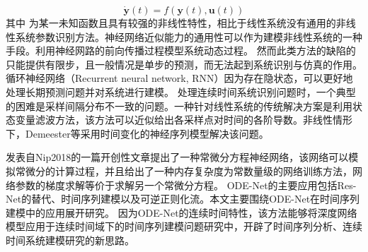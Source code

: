 \begin{equation}
\dot {\boldsymbol y}(t)=f(\boldsymbol y(t), \boldsymbol{u}(t))
\end{equation}
其中 为某一未知函数且具有较强的非线性特性，相比于线性系统没有通用的非线性系统参数识别方法。神经网络近似能力的通用性可以作为建模非线性系统的一种手段\cite{funahashi1993approximation}。利用神经网路的前向传播过程模型系统动态过程\cite{temeng1995model, tan1996nonlinear}。
然而此类方法的缺陷的只能提供有限步，且一般情况是单步的预测，而无法起到系统识别与仿真的作用。循环神经网络（Recurrent neural network, RNN）因为存在隐状态，可以更好地处理长期预测问题并对系统进行建模\cite{delgado1995dynamic, zamarreno1998state}。
处理连续时间系统识别问题时，一个典型的困难是采样间隔分布不一致的问题。一种针对线性系统的传统解决方案是利用状态变量滤波方法，该方法可以近似给出各采样点对时间的各阶导数。非线性情形下，Demeester等\cite{demeester2020system}采用时间变化的神经序列模型解决该问题。

发表自Nip2018的一篇开创性文章\cite{chen2018neural}提出了一种常微分方程神经网络，该网络可以模拟常微分的计算过程，并且给出了一种内存复杂度为常数量级的网络训练方法，网络参数的梯度求解等价于求解另一个常微分方程。
ODE-Net的主要应用包括Res-Net的替代、时间序列建模以及可逆正则化流\cite{Grathwohl2019}。本文主要围绕ODE-Net在时间序列建模中的应用展开研究。
因为ODE-Net的连续时间特性，该方法能够将深度网络模型应用于连续时间域下的时间序列建模问题研究中，开辟了时间序列分析、连续时间系统建模研究的新思路。

